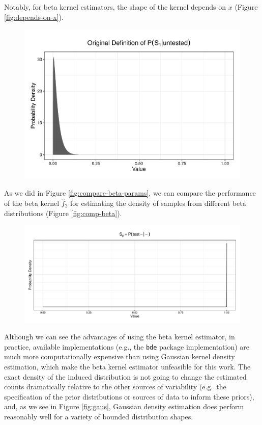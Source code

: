 \documentclass[12pt,twoside]{smiththesis}
\begin{document}
Notably, for beta kernel estimators, the shape of the kernel depends on \(x\) (Figure \ref{fig:depends-on-x}).
\begin{figure}

{\centering \includegraphics[width=1\linewidth]{thesis_files/figure-latex/unnamed-chunk-38-1} 

}

\caption{\label{fig:depends-on-x}}\label{fig:unnamed-chunk-38}
\end{figure}
As we did in Figure \ref{fig:compare-beta-params}, we can compare the performance of the beta kernel \(\hat f_2\) for estimating the density of samples from different beta distributions (Figure \ref{fig:comp-beta}).
\begin{figure}

{\centering \includegraphics[width=1\linewidth]{thesis_files/figure-latex/unnamed-chunk-40-1} 

}

\caption{\label{fig:comp-beta}}\label{fig:unnamed-chunk-40}
\end{figure}
Although we can see the advantages of using the beta kernel estimator, in practice, available implementations (e.g., the \texttt{bde} package implementation) are much more computationally expensive than using Gaussian kernel density estimation, which make the beta kernel estimator unfeasible for this work. The exact density of the induced distribution is not going to change the estimated counts dramatically relative to the other sources of variability (e.g.~the specification of the prior distributions or sources of data to inform these priors), and, as we see in Figure \ref{fig:gaus}, Gaussian density estimation does perform reasonably well for a variety of bounded distribution shapes.
\end{document}
